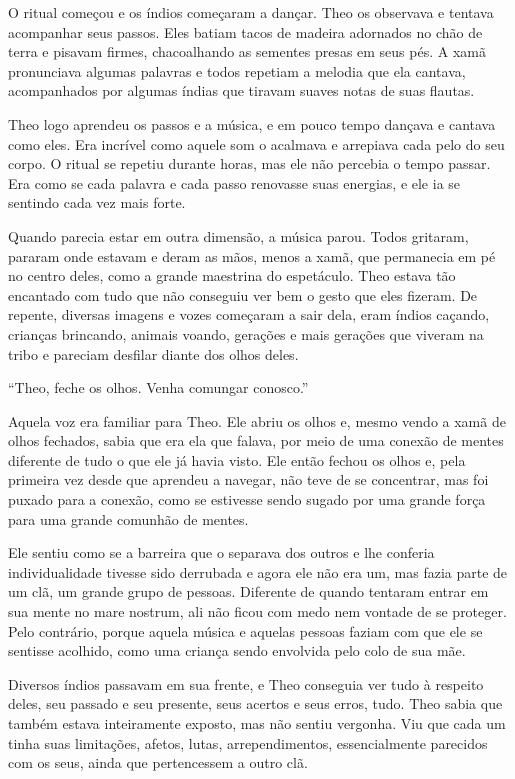 O ritual começou e os índios começaram a dançar. Theo os observava e
tentava acompanhar seus passos. Eles batiam tacos de madeira adornados
no chão de terra e pisavam firmes, chacoalhando as sementes presas em
seus pés. A xamã pronunciava algumas palavras e todos repetiam a melodia
que ela cantava, acompanhados por algumas índias que tiravam suaves
notas de suas flautas.

Theo logo aprendeu os passos e a música, e em pouco tempo dançava e
cantava como eles. Era incrível como aquele som o acalmava e arrepiava
cada pelo do seu corpo. O ritual se repetiu durante horas, mas ele não
percebia o tempo passar. Era como se cada palavra e cada passo renovasse
suas energias, e ele ia se sentindo cada vez mais forte.

Quando parecia estar em outra dimensão, a música parou. Todos gritaram,
pararam onde estavam e deram as mãos, menos a xamã, que permanecia em pé
no centro deles, como a grande maestrina do espetáculo. Theo estava tão
encantado com tudo que não conseguiu ver bem o gesto que eles fizeram.
De repente, diversas imagens e vozes começaram a sair dela, eram índios
caçando, crianças brincando, animais voando, gerações e mais gerações
que viveram na tribo e pareciam desfilar diante dos olhos deles.

``Theo, feche os olhos. Venha comungar conosco.''

Aquela voz era familiar para Theo. Ele abriu os olhos e, mesmo vendo a
xamã de olhos fechados, sabia que era ela que falava, por meio de
uma conexão de mentes diferente de tudo o que ele já havia visto. Ele
então fechou os olhos e, pela primeira vez desde que aprendeu a navegar,
não teve de se concentrar, mas foi puxado para a conexão, como se
estivesse sendo sugado por uma grande força para uma grande comunhão de
mentes.

Ele sentiu como se a barreira que o separava dos outros e lhe conferia
individualidade tivesse sido derrubada e agora ele não era um, mas fazia
parte de um clã, um grande grupo de pessoas. Diferente de quando
tentaram entrar em sua mente no mare nostrum,
ali não ficou com medo nem vontade de se proteger. Pelo contrário,
porque aquela música e aquelas pessoas faziam com que ele se sentisse
acolhido, como uma criança sendo envolvida pelo colo de sua mãe.

Diversos índios passavam em sua frente, e Theo conseguia ver tudo à
respeito deles, seu passado e seu presente, seus acertos e seus erros,
tudo. Theo sabia que também estava inteiramente exposto, mas não sentiu
vergonha. Viu que cada um tinha suas limitações, afetos, lutas,
arrependimentos, essencialmente parecidos com os seus, ainda que
pertencessem a outro clã.

